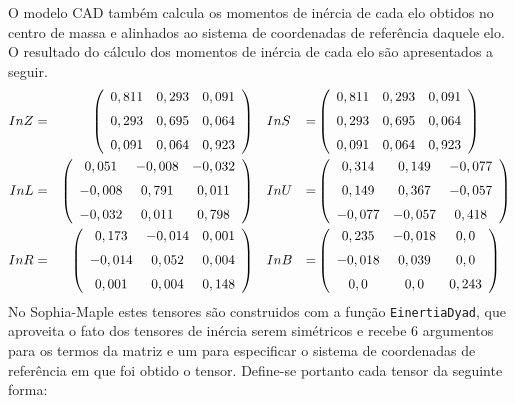 O modelo CAD também calcula os momentos de inércia de cada elo obtidos no
centro de massa e alinhados ao sistema de coordenadas de referência daquele elo.
O resultado do cálculo dos momentos de inércia de cada elo são apresentados a
seguir.
%
\begin{align*}
InZ &=& \left( \begin {array}{ccc}  0,811& 0,293& 0,091\\ \noalign{\medskip}
 0,293& 0,695& 0,064\\ \noalign{\medskip} 0,091& 0,064& 0,923
\end {array} \right) & \quad InS &=& \left( \begin {array}{ccc}  0,811& 0,293& 0,091\\ \noalign{\medskip}
 0,293& 0,695& 0,064\\ \noalign{\medskip} 0,091& 0,064& 0,923
\end {array} \right) \\
InL &=&  \left( \begin {array}{ccc}  0,051&-
0,008&- 0,032 \\ \noalign{\medskip}- 0,008& 0,791& 0,011\\ \noalign{\medskip}- 0,032
& 0,011& 0,798\end {array} \right) & \quad InU &=& \left( \begin {array}{ccc} 
0,314& 0,149&- 0,077\\ \noalign{\medskip} 0,149& 0,367&- 0,057\\ \noalign{\medskip}- 0,077&- 0,057& 0,418
\end {array} \right) \\
InR &=&  \left( \begin {array}{ccc}  0,173&-
0,014& 0,001\\ \noalign{\medskip} - 0,014& 0,052& 0,004\\ \noalign{\medskip} 0,001& 0,004& 0,148
\end {array} \right) & \quad InB &=&  \left( \begin {array}{ccc}  0,235&- 0,018& 0,0\\ \noalign{\medskip}-
 0,018& 0,039& 0,0\\ \noalign{\medskip} 0,0& 0,0& 0,243\end {array}
 \right)
\end{align*}
%
No Sophia-Maple estes tensores são construidos com a função
\texttt{EinertiaDyad}, que aproveita o fato dos tensores de inércia serem
simétricos e recebe 6 argumentos para os termos da matriz e um para especificar
o sistema de coordenadas de referência em que foi obtido o tensor. Define-se
portanto cada tensor da seguinte forma:

